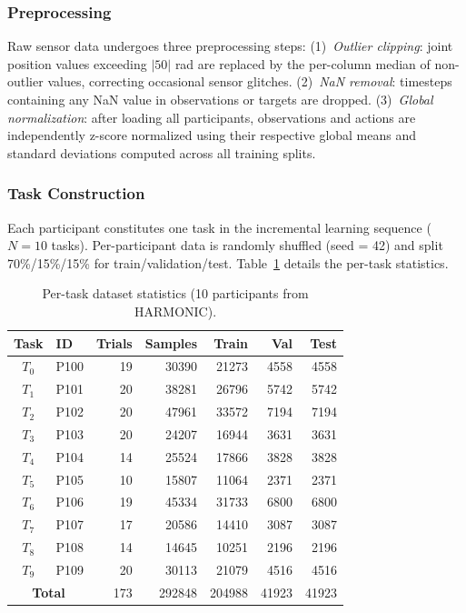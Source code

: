 \documentclass[3p,times,procedia]{elsarticle}
\begin{document}
\subsubsection{Preprocessing}

Raw sensor data undergoes three preprocessing steps: (1)~\textit{Outlier clipping}: joint position values exceeding $|50|$ rad are replaced by the per-column median of non-outlier values, correcting occasional sensor glitches. (2)~\textit{NaN removal}: timesteps containing any NaN value in observations or targets are dropped. (3)~\textit{Global normalization}: after loading all participants, observations and actions are independently z-score normalized using their respective global means and standard deviations computed across all training splits.

\subsubsection{Task Construction}

Each participant constitutes one task in the incremental learning sequence ($N = 10$ tasks). Per-participant data is randomly shuffled (seed = 42) and split 70\%/15\%/15\% for train/validation/test. Table~\ref{tab:tasks} details the per-task statistics.

\begin{table}[t]
\caption{Per-task dataset statistics (10 participants from HARMONIC).}
\label{tab:tasks}
\centering
\footnotesize
\setlength{\tabcolsep}{4pt}
\begin{tabular}{@{}clrrrrr@{}}
\toprule
\textbf{Task} & \textbf{ID} & \textbf{Trials} & \textbf{Samples} & \textbf{Train} & \textbf{Val} & \textbf{Test} \\
\midrule
$T_0$ & P100 & 19 & 30390 & 21273 & 4558 & 4558 \\
$T_1$ & P101 & 20 & 38281 & 26796 & 5742 & 5742 \\
$T_2$ & P102 & 20 & 47961 & 33572 & 7194 & 7194 \\
$T_3$ & P103 & 20 & 24207 & 16944 & 3631 & 3631 \\
$T_4$ & P104 & 14 & 25524 & 17866 & 3828 & 3828 \\
$T_5$ & P105 & 10 & 15807 & 11064 & 2371 & 2371 \\
$T_6$ & P106 & 19 & 45334 & 31733 & 6800 & 6800 \\
$T_7$ & P107 & 17 & 20586 & 14410 & 3087 & 3087 \\
$T_8$ & P108 & 14 & 14645 & 10251 & 2196 & 2196 \\
$T_9$ & P109 & 20 & 30113 & 21079 & 4516 & 4516 \\
\midrule
\multicolumn{2}{c}{\textbf{Total}} & 173 & 292848 & 204988 & 41923 & 41923 \\
\bottomrule
\end{tabular}
\end{table}
\end{document}
